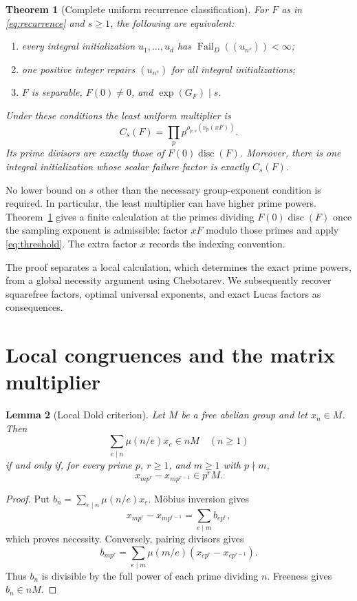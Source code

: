 \documentclass[11pt]{article}
\newtheorem{theorem}{Theorem}
\newtheorem{lemma}[theorem]{Lemma}
\theoremstyle{remark}
\newcommand{\disc}{\operatorname{disc}}
\newcommand{\Fail}{\operatorname{Fail}_{D}}
\begin{document}
\begin{theorem}[Complete uniform recurrence classification]\label{thm:recurrence}
For $F$ as in \eqref{eq:recurrence} and $s\geq1$, the following are equivalent:
\begin{enumerate}
\item every integral initialization $u_1,\ldots,u_d$ has $\Fail((u_{n^s}))<\infty$;
\item one positive integer repairs $(u_{n^s})$ for all integral initializations;
\item $F$ is separable, $F(0)\neq0$, and $\exp(G_F)\mid s$.
\end{enumerate}
Under these conditions the least uniform multiplier is
\begin{equation}\label{eq:recfactor}
 C_s(F)=\prod_p p^{\rho_{p,s}(\nu_p(xF))}.
\end{equation}
Its prime divisors are exactly those of $F(0)\disc(F)$. Moreover, there is one integral initialization whose scalar failure factor is exactly $C_s(F)$.
\end{theorem}

No lower bound on $s$ other than the necessary group-exponent condition is required. In particular, the least multiplier can have higher prime powers. Theorem~\ref{thm:recurrence} gives a finite calculation at the primes dividing $F(0)\disc(F)$ once the sampling exponent is admissible: factor $xF$ modulo those primes and apply \eqref{eq:threshold}. The extra factor $x$ records the indexing convention.

The proof separates a local calculation, which determines the exact prime powers, from a global necessity argument using Chebotarev. We subsequently recover squarefree factors, optimal universal exponents, and exact Lucas factors as consequences.

\section{Local congruences and the matrix multiplier}
\begin{lemma}[Local Dold criterion]\label{lem:local}
Let $M$ be a free abelian group and let $x_n\in M$. Then
\[
 \sum_{e\mid n}\mu(n/e)x_e\in nM\quad(n\geq1)
\]
if and only if, for every prime $p$, $r\geq1$, and $m\geq1$ with $p\nmid m$,
\[
 x_{mp^r}-x_{mp^{r-1}}\in p^r M.
\]
\end{lemma}
\begin{proof}
Put $b_n=\sum_{e\mid n}\mu(n/e)x_e$. M\"obius inversion gives
\[
 x_{mp^r}-x_{mp^{r-1}}=\sum_{e\mid m}b_{ep^r},
\]
which proves necessity. Conversely, pairing divisors gives
\[
 b_{mp^r}=\sum_{e\mid m}\mu(m/e)(x_{ep^r}-x_{ep^{r-1}}).
\]
Thus $b_n$ is divisible by the full power of each prime dividing $n$. Freeness gives $b_n\in nM$.
\end{proof}
\end{document}
